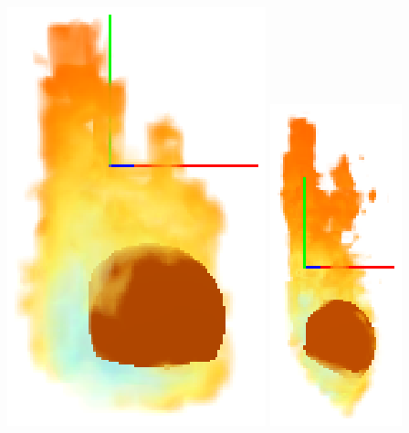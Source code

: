 \documentclass[a4paper,10pt]{article}
\begin{document}
  
    \begin{center}
	\includegraphics[scale=0.6]{Decomposition0.ps}
	\includegraphics[scale=0.8]{Decomposition2.ps}

\end{center}
\end{document}
